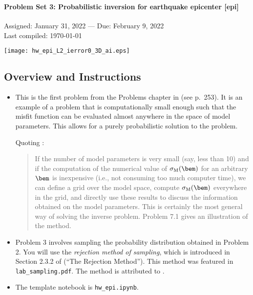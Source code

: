 \documentclass[11pt,titlepage,fleqn]{article}
\begin{document}

\begin{center}

{\large \bf Problem Set 3: Probabilistic inversion for earthquake epicenter [epi]} \\
\cltag\ \\
Assigned: January 31, 2022 --- Due: February 9, 2022 \\
Last compiled: \today

\texttt{[image: hw\_epi\_L2\_ierror0\_3D\_ai.eps]}
\end{center}


\subsection*{Overview and Instructions}

\begin{itemize}
\item This is the first problem from the Problems chapter in \citet{Tarantola2005} (see p.~253). It is an example of a problem that is computationally small enough such that the misfit function can be evaluated almost anywhere in the space of model parameters. This allows for a purely probabilistic solution to the problem.

Quoting \citet[][p.~38]{Tarantola2005}:
\begin{quote}
If the number of model parameters is very small (say, less than 10) and if the computation of the numerical value of $\sigma_{\rm M}(\bem)$ for an arbitrary $\bem$ is inexpensive (i.e., not consuming too much computer time), we can define a grid over the model space, compute $\sigma_{\rm M}(\bem)$ everywhere in the grid, and directly use these results to discuss the information obtained on the model parameters. This is certainly the most general way of solving the inverse problem. Problem 7.1 gives an illustration of the method.
\end{quote}

\item Problem 3 involves sampling the probability distribution obtained in Problem 2. You will use the {\em rejection method of sampling}, which is introduced in Section 2.3.2 of \citet{Tarantola2005} (``The Rejection Method''). This method was featured in \verb+lab_sampling.pdf+. The method is attributed to \citet{vonNeumann1951}.

\item The template notebook is \verb+hw_epi.ipynb+.
%
\end{itemize}
\end{document}
